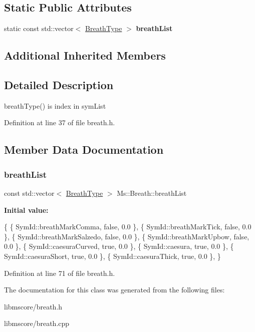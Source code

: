 \subsection*{Static Public Attributes}
\begin{DoxyCompactItemize}
\item 
static const std\+::vector$<$ \hyperlink{struct_ms_1_1_breath_type}{Breath\+Type} $>$ {\bfseries breath\+List}
\end{DoxyCompactItemize}
\subsection*{Additional Inherited Members}


\subsection{Detailed Description}
breath\+Type() is index in sym\+List 

Definition at line 37 of file breath.\+h.



\subsection{Member Data Documentation}
\mbox{\label{class_ms_1_1_breath_ae13c23e793535b06ccb585b45a20be43}} 
\subsubsection{\texorpdfstring{breath\+List}{breathList}}
{\footnotesize\ttfamily const std\+::vector$<$ \hyperlink{struct_ms_1_1_breath_type}{Breath\+Type} $>$ Ms\+::\+Breath\+::breath\+List\hspace{0.3cm}{\ttfamily [static]}}

{\bfseries Initial value\+:}
\begin{DoxyCode}
\{
      \{ SymId::breathMarkComma,      \textcolor{keyword}{false}, 0.0 \},
      \{ SymId::breathMarkTick,       \textcolor{keyword}{false}, 0.0 \},
      \{ SymId::breathMarkSalzedo,    \textcolor{keyword}{false}, 0.0 \},
      \{ SymId::breathMarkUpbow,      \textcolor{keyword}{false}, 0.0 \},
      \{ SymId::caesuraCurved,        \textcolor{keyword}{true},  0.0 \},
      \{ SymId::caesura,              \textcolor{keyword}{true},  0.0 \},
      \{ SymId::caesuraShort,         \textcolor{keyword}{true},  0.0 \},
      \{ SymId::caesuraThick,         \textcolor{keyword}{true},  0.0 \},
      \}
\end{DoxyCode}


Definition at line 71 of file breath.\+h.



The documentation for this class was generated from the following files\+:\begin{DoxyCompactItemize}
\item 
libmscore/breath.\+h\item 
libmscore/breath.\+cpp\end{DoxyCompactItemize}

